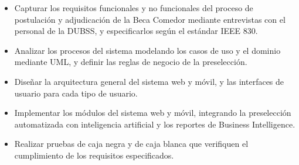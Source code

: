 \begin{itemize}
    \item Capturar los requisitos funcionales y no funcionales del proceso de postulación y adjudicación de la Beca Comedor mediante entrevistas con el personal de la DUBSS, y especificarlos según el estándar IEEE 830.

    \item Analizar los procesos del sistema modelando los casos de uso y el dominio mediante UML, y definir las reglas de negocio de la preselección.

    \item Diseñar la arquitectura general del sistema web y móvil, y las interfaces de usuario para cada tipo de usuario.

    \item Implementar los módulos del sistema web y móvil, integrando la preselección automatizada con inteligencia artificial y los reportes de Business Intelligence.

    \item Realizar pruebas de caja negra y de caja blanca que verifiquen el cumplimiento de los requisitos especificados.
\end{itemize}
